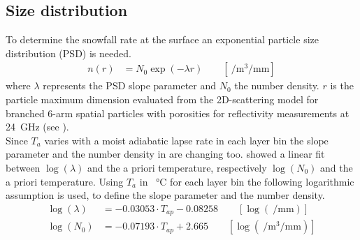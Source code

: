 \subsection{Size distribution} \label{sec:size_dist}
To determine the snowfall rate at the surface an exponential particle size distribution (PSD) is needed. 
\begin{align}
	n(r) & = N_{0} \exp\left(-\lambda r\right) \qquad [ \SI{}{\per\cubic\metre\per\mm} ] \label{eq:num_dens}
\end{align}
where $\lambda$ represents the PSD slope parameter and $N_{0}$ the number density. $r$ is the particle maximum dimension evaluated from the 2D-scattering model for branched 6-arm spatial particles with porosities for reflectivity measurements at \SI{24}{\giga\Hz} (see ).
\\
Since $T_{a}$ varies with a moist adiabatic lapse rate in each layer bin the slope parameter and the number density in  are changing too. \cite{wood_estimation_2011} showed a linear fit between $\log(\lambda)$ and the a priori temperature, respectively $\log(N_0)$ and the a priori temperature.
Using $T_{a}$ in \SI{}{\celsius} for each layer bin the following logarithmic assumption is used, to define the slope parameter and the number density.
\begin{align}
	\log(\lambda) & = -0.03053 \cdot T_{ap} - 0.08258  \label{eq:lambda} \qquad [ \log(\SI{}{\per\mm}) ]\\
	\log(N_0) & = -0.07193 \cdot T_{ap} +2.665  \qquad [ \log(\SI{}{\per\cubic\metre\per\mm})]
	\label{eq:N0}
\end{align}
